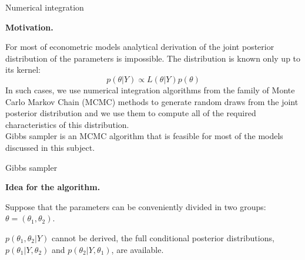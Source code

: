\documentclass[notes,blackandwhite,mathsans]{beamer}
\begin{document}
\begin{frame}{Numerical integration}

\textbf{Motivation.}

{\color{mcxs2}For most of econometric models analytical derivation of the joint posterior distribution of the parameters is impossible. The distribution is known only up to its kernel:}
$$ p(\theta|Y)\propto L(\theta|Y)p(\theta) $$
{\color{mcxs2}In such cases, we use numerical integration algorithms from the family of Monte Carlo Markov Chain (MCMC) methods to generate random draws from the joint posterior distribution and we use them to compute all of the required characteristics of this distribution.\\

\smallskip Gibbs sampler is an MCMC algorithm that is feasible for most of the models discussed in this subject. }

\end{frame}



\begin{frame}{Gibbs sampler}

\textbf{Idea for the algorithm.}

{\color{mcxs2} Suppose that the parameters can be conveniently divided in two groups:} $\theta=(\theta_1, \theta_2)$.

 $p(\theta_1, \theta_2|Y)$ {\color{mcxs2}cannot be derived, the} {\color{mcxs3}full conditional posterior distributions}, $p(\theta_1|Y,\theta_2)$ {\color{mcxs2}and} $p(\theta_2|Y,\theta_1)${\color{mcxs2}, are available.}

\end{frame}
\end{document}
